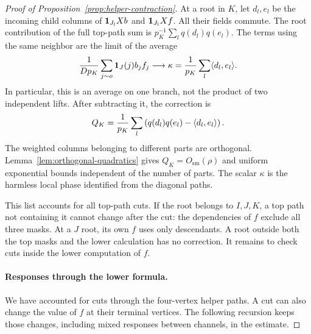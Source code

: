\begin{proof}[Proof of Proposition~\ref{prop:helper-contraction}]
At a root in \(K\), let \(d_l,e_l\) be the incoming child columns
of \(\mathbf 1_{J_l}Xb\) and \(\mathbf 1_{J_l}Xf\).  All their fields commute.
The root contribution of the full top-path sum is
\(p_K^{-1}\sum_l q(d_l)q(e_l)\).  The terms using the same neighbor
are the limit of the average
\[
 \frac1{Dp_K}\sum_{j\sim o}\mathbf 1_J(j)b_jf_j
       \longrightarrow
       \kappa=\frac1{p_K}\sum_l\langle d_l,e_l\rangle.
\]
In particular, this is an average on one branch, not the product of
two independent lifts.  After subtracting it, the correction is
\begin{equation}
 Q_K=\frac1{p_K}\sum_l
       \left(q(d_l)q(e_l)-\langle d_l,e_l\rangle\right).
 \label{eq:helper-root-quadratic}
\end{equation}
The weighted columns belonging to different parts are orthogonal.
Lemma~\ref{lem:orthogonal-quadratics} gives
\(Q_K=O_{\mathrm{sm}}(\rho)\) and uniform exponential bounds
independent of the number of parts.  The scalar \(\kappa\) is the
harmless local phase identified from the diagonal paths.

This list accounts for all top-path cuts.  If the root belongs to
\(I,J,K\), a top path not containing it cannot change after the cut:
the dependencies of \(f\) exclude all three masks.  At a \(J\)
root, its own \(f\) uses only descendants.  A root outside both the
top masks and the lower calculation has no correction.  It remains
to check cuts inside the lower computation of \(f\).

\paragraph{Responses through the lower formula.}
We have accounted for cuts through the four-vertex helper paths.  A cut
can also change the value of \(f\) at their terminal vertices.  The
following recursion keeps those changes, including mixed responses
between channels, in the estimate.


\end{proof}
